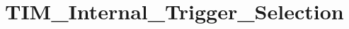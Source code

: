 \hypertarget{group___t_i_m___internal___trigger___selection}{\section{T\-I\-M\-\_\-\-Internal\-\_\-\-Trigger\-\_\-\-Selection}
\label{group___t_i_m___internal___trigger___selection}
}
